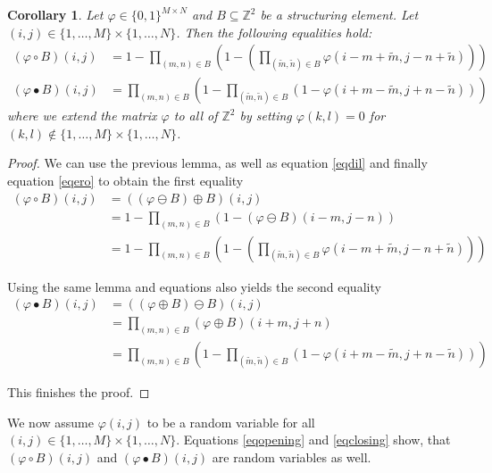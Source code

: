 \documentclass[a4paper,12pt]{article}
\theoremstyle{plain}
\newtheorem{corollary}[theorem]{Corollary}
\theoremstyle{definition}
\theoremstyle{remark}
\begin{document}
\begin{corollary}
	Let $\varphi \in \{ 0, 1 \}^{M \times N}$ and $B \subseteq \mathbb{Z}^2$ be a structuring element. Let $(i, j) \in \{ 1, \dots, M \} \times \{ 1, \dots, N \}$. Then the following equalities hold:
	\begin{align}
		(\varphi \circ B)(i, j) &= 1 - \prod_{(m, n) \in B} \left( 1 - \left( \prod_{(\tilde{m}, \tilde{n}) \in B} \varphi(i - m + \tilde{m}, j - n + \tilde{n}) \right) \right) \label{eqopening} \\
		(\varphi \bullet B)(i, j) &= \prod_{(m, n) \in B} \left( 1 - \prod_{(\tilde{m}, \tilde{n}) \in B} ( 1 - \varphi(i + m - \tilde{m}, j + n - \tilde{n}) ) \right) \label{eqclosing}
	\end{align}
	where we extend the matrix $\varphi$ to all of $\mathbb{Z}^2$ by setting $\varphi(k, l) = 0$ for $(k, l) \notin \{ 1, \dots, M \} \times \{ 1, \dots, N \}$.
\end{corollary}
\begin{proof}
	We can use the previous lemma, as well as equation \eqref{eqdil} and finally equation \eqref{eqero} to obtain the first equality
	\begin{align*}
		(\varphi \circ B)(i, j) &= ((\varphi \ominus B) \oplus B)(i, j) \\
		&= 1 - \prod_{(m, n) \in B} ( 1 - (\varphi \ominus B)(i - m, j - n) ) \\
		&= 1 - \prod_{(m, n) \in B} \left( 1 - \left( \prod_{(\tilde{m}, \tilde{n}) \in B} \varphi(i - m + \tilde{m}, j - n + \tilde{n}) \right) \right)
	\end{align*}
	
	Using the same lemma and equations also yields the second equality
	\begin{align*}
		(\varphi \bullet B)(i, j) &= ((\varphi \oplus B) \ominus B)(i, j) \\
		&= \prod_{(m, n) \in B} (\varphi \oplus B)(i + m, j + n) \\
		&= \prod_{(m, n) \in B} \left( 1 - \prod_{(\tilde{m}, \tilde{n}) \in B} ( 1 - \varphi(i + m - \tilde{m}, j + n - \tilde{n}) ) \right)
	\end{align*}
	
	This finishes the proof.
\end{proof}

We now assume $\varphi(i, j)$ to be a random variable for all $(i, j) \in \{ 1, \dots, M \} \times \{ 1, \dots, N \}$. Equations \eqref{eqopening} and \eqref{eqclosing} show, that $(\varphi \circ B)(i, j)$ and $(\varphi \bullet B)(i, j)$ are random variables as well.
\end{document}
